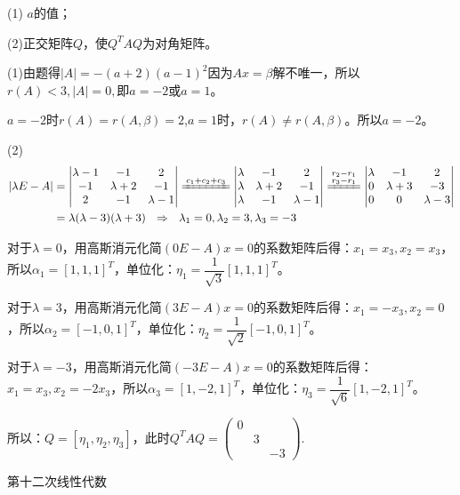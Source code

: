 \documentclass[a4paper]{report}
\begin{document}
(1) $a$的值；

(2)正交矩阵$Q$，使$Q^TAQ$为对角矩阵。

\begin{jie}
(1)由题得$|A|=-(a+2)(a-1)^2$因为$Ax=\beta$解不唯一，所以$r(A)<3,|A|=0,$即$a=-2$或$a=1$。

$a=-2$时$r(A)=r(A,\beta)=2$,$a=1$时，$r(A)\neq r(A,\beta)$。所以$a=-2$。

(2)
\begin{align*}
|\lambda E-A|&=
\begin{vmatrix}
\lambda -1&-1&2\\
-1&\lambda+2&-1\\
2&-1&\lambda -1
\end{vmatrix}
\xlongequal{c_1+c_2+c_3}
\begin{vmatrix}
\lambda&-1&2\\
\lambda&\lambda+2&-1\\
\lambda&-1&\lambda -1
\end{vmatrix}\xlongequal{\substack{r_2-r_1\\ r_3-r_1}}
\begin{vmatrix}
\lambda&-1&2\\
0&\lambda+3&-3\\
0&0&\lambda -3
\end{vmatrix}\\&=\lambda(\lambda-3)(\lambda+3)~~\Rightarrow~~\lambda_1=0,\lambda_2=3,\lambda_3=-3
\end{align*}

对于$\lambda=0$，用高斯消元化简$(0E-A)x=0$的系数矩阵后得：$x_1=x_3,x_2=x_3$，所以$\alpha_1=[1,1,1]^T$，单位化：$\eta_1=\dfrac{1}{\sqrt{3}}[1,1,1]^T$。

对于$\lambda=3$，用高斯消元化简$(3E-A)x=0$的系数矩阵后得：$x_1=-x_3,x_2=0$，所以$\alpha_2=[-1,0,1]^T$，单位化：$\eta_2=\dfrac{1}{\sqrt{2}}[-1,0,1]^T$。

对于$\lambda=-3$，用高斯消元化简$(-3E-A)x=0$的系数矩阵后得：$x_1=x_3,x_2=-2x_3$，所以$\alpha_3=[1,-2,1]^T$，单位化：$\eta_3=\dfrac{1}{\sqrt{6}}[1,-2,1]^T$。

所以：$Q=[\eta_1,\eta_2,\eta_3]$，此时$Q^TAQ=
\begin{pmatrix}
0\\&3\\&&-3
\end{pmatrix}
$.
\end{jie}

\clearpage
\hphantom{~~}\hfill {\heiti 第十二次线性代数} \hfill\hphantom{~~}
\end{document}
